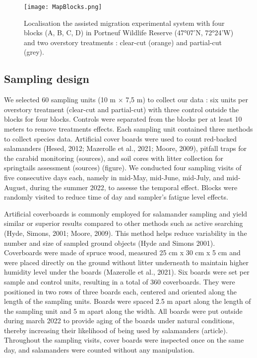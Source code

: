 \begin{figure}[ht!]
	\centering
	\texttt{[image: MapBlocks.png]}
	\caption[Localisation of study sites in Portneuf, Canada.]{Localisation the assisted migration experimental system with four blocks (A, B, C, D) in Portneuf Wildlife Reserve (47°07'N, 72°24'W) and two overstory treatments : clear-cut (orange) and partial-cut (grey).}
	\label{fig:cartoblock}
	\end{figure}  



\subsection*{Sampling design}
\label{subsec:sampling}

We selected 60 sampling units (10 m $\times$ 7,5 m) to collect our data : six units per overstory treatment (clear-cut and partial-cut) with three control outside the blocks for four blocks.
Controls were separated from the blocks per at least 10 meters to remove treatments effects.
Each sampling unit contained three methods to collect species data. 
Artificial cover boards were used to count red-backed salamanders (Hesed, 2012; Mazerolle et al., 2021; Moore, 2009), 
pitfall traps for the carabid monitoring (sources), and soil cores with litter collection for springtails assessment (sources) (figure).
We conducted four sampling visits of five consecutive days each, namely in mid-May, mid-June, mid-July, and mid-August, during the summer 2022, to assesse the temporal effect. 
Blocks were randomly visited to reduce time of day and sampler's fatigue level effects.

Artificial coverboards is commonly employed for salamander sampling and yield similar or superior results compared to other methods such as active searching (Hyde, Simons, 2001; Moore, 2009). 
This method helps reduce variability in the number and size of sampled ground objects (Hyde and Simons 2001). 
Coverboards were made of spruce wood, measured 25 cm x 30 cm x 5 cm and were placed directly on the ground without litter underneath to maintain higher humidity level under the boards (Mazerolle et al., 2021). 
Six boards were set per sample and control units, resulting in a total of 360 coverboards.
They were positioned in two rows of three boards each, centered and oriented along the length of the sampling units.
Boards were spaced 2.5 m apart along the length of the sampling unit and 5 m apart along the width.
All boards were put outside during march 2022 to provide aging of the boards under natural conditions, thereby increasing their likelihood of being used by salamanders (article).
Throughout the sampling visits, cover boards were inspected once on the same day, and salamanders were counted without any manipulation.

